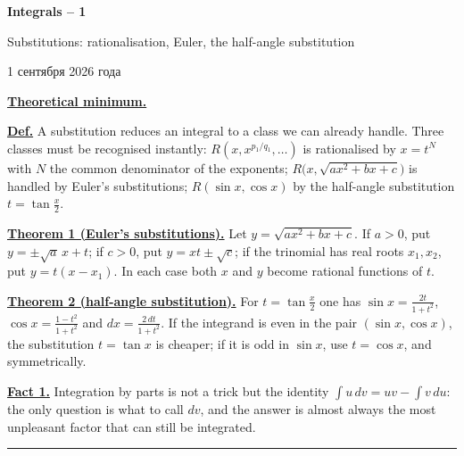 \documentclass[11pt,a4paper]{article}
\newcommand{\head}[1]{\par\bigskip\noindent\textbf{\underline{#1}}\quad}
\begin{document}
\begin{center}
{\huge\bfseries Integrals -- 1\par}\vspace{1.2em}
{\Large Substitutions: rationalisation, Euler, the half-angle substitution\par}\vspace{0.8em}
{\foreignlanguage{russian}{1 сентября 2026 года}\par}
\end{center}

\noindent\textbf{\underline{Theoretical minimum.}}\par\vspace{-\bigskipamount}\medskip

\head{Def.} A substitution reduces an integral to a class we can already handle. Three classes must
be recognised instantly: $R(x,x^{p_1/q_1},\dots)$ is rationalised by $x=t^N$ with $N$ the common
denominator of the exponents; $R\bigl(x,\sqrt{ax^2+bx+c}\bigr)$ is handled by Euler's
substitutions; $R(\sin x,\cos x)$ by the half-angle substitution $t=\tan\frac x2$.

\head{Theorem 1 (Euler's substitutions).} Let $y=\sqrt{ax^2+bx+c}$. If $a>0$, put
$y=\pm\sqrt a\,x+t$; if $c>0$, put $y=xt\pm\sqrt c$; if the trinomial has real roots $x_1,x_2$, put
$y=t(x-x_1)$. In each case both $x$ and $y$ become rational functions of $t$.

\head{Theorem 2 (half-angle substitution).} For $t=\tan\frac x2$ one has $\sin x=\frac{2t}{1+t^2}$,
$\cos x=\frac{1-t^2}{1+t^2}$ and $dx=\frac{2\,dt}{1+t^2}$. If the integrand is even in the pair
$(\sin x,\cos x)$, the substitution $t=\tan x$ is cheaper; if it is odd in $\sin x$, use $t=\cos x$,
and symmetrically.

\head{Fact 1.} Integration by parts is not a trick but the identity $\int u\,dv=uv-\int v\,du$: the
only question is what to call $dv$, and the answer is almost always the most unpleasant factor that
can still be integrated.

\noindent\rule{\textwidth}{0.4pt}\par\medskip
\end{document}
